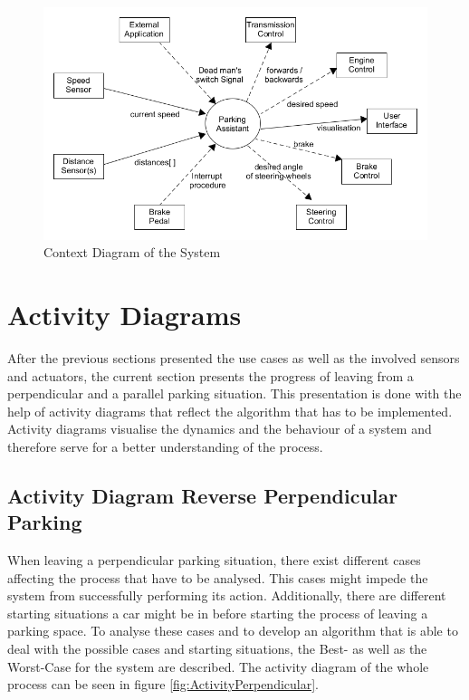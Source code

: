 \begin{figure}
\centering
\captionsetup{justification=centering}
\includegraphics[width=\textwidth]{res/systemAnalysis/ContextDiagram.png}
\caption{Context Diagram of the System}
\label{fig:ContextDiagram}
\end{figure}

\section{Activity Diagrams}
After the previous sections presented the use cases as well as the involved
sensors and actuators, the current section presents the progress of leaving from
a perpendicular and a parallel parking situation. This presentation is done with
the help of activity diagrams that reflect the algorithm that has to be
implemented. Activity diagrams visualise the dynamics and the behaviour of a
system and therefore serve for a better understanding of the process.


\subsection{Activity Diagram Reverse Perpendicular Parking}
When leaving a perpendicular parking situation, there exist different cases
affecting the process that have to be analysed. This cases might impede the
system from successfully performing its action. Additionally, there are
different starting situations a car might be in before starting the process of
leaving a parking space. To analyse these cases and to develop an algorithm that
is able to deal with the possible cases and starting situations, the Best- as
well as the Worst-Case for the system are described.  The activity diagram of
the whole process can be seen in figure \ref{fig:ActivityPerpendicular}.

